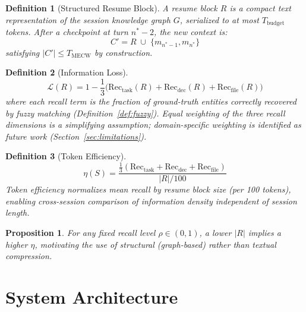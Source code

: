 \documentclass[journal]{IEEEtran}
\newtheorem{definition}{Definition}
\newtheorem{proposition}{Proposition}
\begin{document}
\begin{definition}[Structured Resume Block]
A resume block $R$ is a compact text representation of the
session knowledge graph $G$, serialized to at most
$T_{\mathrm{budget}}$ tokens.
After a checkpoint at turn $n^* - 2$, the new context is:
\begin{equation}
  C' = R \;\cup\; \{m_{n^*-1}, m_{n^*}\}
  \label{eq:resume}
\end{equation}
satisfying $|C'| \leq T_{\mathrm{MECW}}$ by construction.
\end{definition}

\begin{definition}[Information Loss]
\begin{equation}
  \mathcal{L}(R) = 1 - \frac{1}{3}
    \bigl(\mathrm{Rec}_\mathrm{task}(R) +
           \mathrm{Rec}_\mathrm{dec}(R) +
           \mathrm{Rec}_\mathrm{file}(R)\bigr)
  \label{eq:infoloss}
\end{equation}
where each recall term is the fraction of ground-truth
entities correctly recovered by fuzzy matching
(Definition~\ref{def:fuzzy}).
Equal weighting of the three recall dimensions is a
simplifying assumption; domain-specific weighting is
identified as future work (Section~\ref{sec:limitations}).
\end{definition}

\begin{definition}[Token Efficiency]
\begin{equation}
  \eta(S) = \frac{\frac{1}{3}(\mathrm{Rec}_\mathrm{task} +
             \mathrm{Rec}_\mathrm{dec} +
             \mathrm{Rec}_\mathrm{file})}{|R|/100}
  \label{eq:efficiency}
\end{equation}
Token efficiency normalizes mean recall by resume block size
(per 100 tokens), enabling cross-session comparison of
information density independent of session length.
\end{definition}

\begin{proposition}
For any fixed recall level $\rho \in (0,1)$, a lower
$|R|$ implies a higher $\eta$, motivating the use of
structural (graph-based) rather than textual compression.
\end{proposition}

\section{System Architecture}
\label{sec:system}
\end{document}
